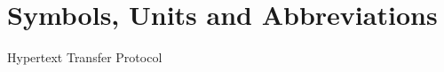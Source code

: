 \chapter*{Symbols, Units and Abbreviations}

\begin{acronym}
  {Hypertext Transfer Protocol}
\end{acronym}
\newpage